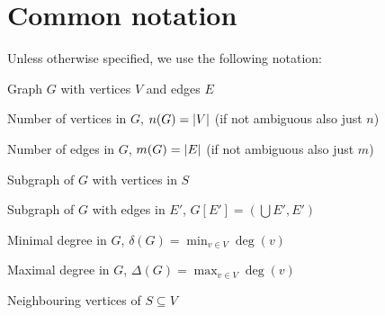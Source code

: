 \section*{Common notation}

Unless otherwise specified, we use the following notation:

\begin{description}[align=left, labelwidth=2cm]
\item[$G$] Graph $G$ with vertices $V$ and edges $E$
\item[$n(G)$] Number of vertices in $G$, $n(G) = \left\lvert V\right\rvert$ (if not
ambiguous also just $n$)
\item[$m(G)$] Number of edges in $G$, $m(G) = \left\lvert E\right\rvert$ (if not
ambiguous also just $m$)
\item[{$G[S]$}] Subgraph of $G$ with vertices in $S$
\item[{$G[E']$}] Subgraph of $G$ with edges in $E'$,
$G[E'] = (\bigcup E', E')$
\item[$\delta(G)$] Minimal degree in $G$,
$\delta(G) = \displaystyle \min_{v \in V} \deg(v)$
\item[$\Delta(G)$] Maximal degree in $G$,
$\Delta(G) = \displaystyle \max_{v \in V} \deg(v)$
\item[$N(S)$] Neighbouring vertices of $S \subseteq V$
\end{description}
